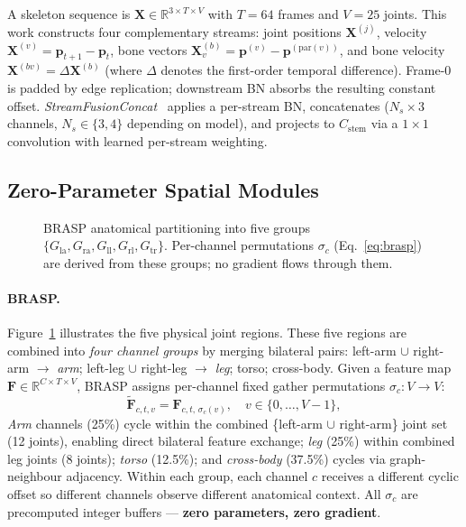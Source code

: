\documentclass[sigconf,screen,review,anonymous]{acmart}
\begin{document}
A skeleton sequence is $\mathbf{X}\!\in\!\mathbb{R}^{3\times T\times V}$
with $T{=}64$ frames and $V{=}25$ joints.
This work constructs four complementary streams:
joint positions $\mathbf{X}^{(j)}$, velocity $\mathbf{X}^{(v)}{=}\mathbf{p}_{t+1}{-}\mathbf{p}_t$,
bone vectors $\mathbf{X}^{(b)}_{v}{=}\mathbf{p}^{(v)}{-}\mathbf{p}^{(\text{par}(v))}$,
and bone velocity $\mathbf{X}^{(bv)}{=}\Delta\mathbf{X}^{(b)}$ (where $\Delta$ denotes the first-order temporal difference).
Frame-0 is padded by edge replication; downstream BN absorbs the resulting constant offset.
\emph{StreamFusionConcat}~\cite{efficientgcn} applies a per-stream BN,
concatenates ($N_s{\times}3$ channels, $N_s\!\in\!\{3,4\}$ depending on model),
and projects to $C_\text{stem}$ via a $1{\times}1$ convolution with learned
per-stream weighting.

\subsection{Zero-Parameter Spatial Modules}\label{sec:zero}

\begin{figure}[htpb]\vspace{-2mm}
\centering
\resizebox{\columnwidth}{!}{}
\caption{BRASP anatomical partitioning into five groups $\{G_\text{la},
  G_\text{ra}, G_\text{ll}, G_\text{rl}, G_\text{tr}\}$.
  Per-channel permutations $\sigma_c$ (Eq.~\ref{eq:brasp}) are derived from
  these groups; no gradient flows through them.}
\label{fig:brasp}
\vspace{-3mm}\end{figure}

\paragraph{BRASP.}
Figure~\ref{fig:brasp} illustrates the five physical joint regions.
These five regions are combined into \emph{four channel groups} by merging
bilateral pairs: left-arm $\cup$ right-arm $\to$ \emph{arm};
left-leg $\cup$ right-leg $\to$ \emph{leg}; torso; cross-body.
Given a feature map $\mathbf{F}\!\in\!\mathbb{R}^{C\times T\times V}$,
BRASP assigns per-channel fixed gather permutations $\sigma_c\!:\!V\!\to\!V$:
\begin{equation}
  \tilde{\mathbf{F}}_{c,t,v}
  = \mathbf{F}_{c,t,\,\sigma_c(v)}, \quad v\in\{0,\ldots,V-1\},
  \label{eq:brasp}
\end{equation}
\emph{Arm} channels (25\%) cycle within the combined \{left-arm $\cup$ right-arm\}
joint set (12 joints), enabling direct bilateral feature exchange;
\emph{leg} (25\%) within combined leg joints (8 joints);
\emph{torso} (12.5\%); and \emph{cross-body} (37.5\%) cycles via
graph-neighbour adjacency.
Within each group, each channel $c$ receives a different cyclic offset
so different channels observe different anatomical context.
All $\sigma_c$ are precomputed integer buffers ---
\textbf{zero parameters, zero gradient}.
\end{document}
